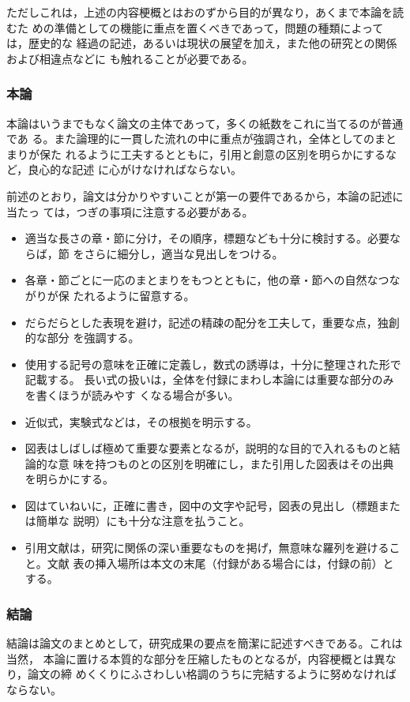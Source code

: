 \documentclass[master]{kuisthesis}		%
\begin{document}
ただしこれは，上述の内容梗概とはおのずから目的が異なり，あくまで本論を読むた
めの準備としての機能に重点を置くべきであって，問題の種類によっては，歴史的な
経過の記述，あるいは現状の展望を加え，また他の研究との関係および相違点などに
も触れることが必要である。

\subsubsection{本論}\label{subsubsec-main}
本論はいうまでもなく論文の主体であって，多くの紙数をこれに当てるのが普通であ
る。また論理的に一貫した流れの中に重点が強調され，全体としてのまとまりが保た
れるように工夫するとともに，引用と創意の区別を明らかにするなど，良心的な記述
に心がけなければならない。

前述のとおり，論文は分かりやすいことが第一の要件であるから，本論の記述に当たっ
ては，つぎの事項に注意する必要がある。
\begin{itemize}%
\item
適当な長さの章・節に分け，その順序，標題なども十分に検討する。必要ならば，節
をさらに細分し，適当な見出しをつける。
\item
各章・節ごとに一応のまとまりをもつとともに，他の章・節への自然なつながりが保
たれるように留意する。
\item
だらだらとした表現を避け，記述の精疎の配分を工夫して，重要な点，独創的な部分
を強調する。
\item
使用する記号の意味を正確に定義し，数式の誘導は，十分に整理された形で記載する。
長い式の扱いは，全体を付録にまわし本論には重要な部分のみを書くほうが読みやす
くなる場合が多い。
\item
近似式，実験式などは，その根拠を明示する。
\item
図表はしばしば極めて重要な要素となるが，説明的な目的で入れるものと結論的な意
味を持つものとの区別を明確にし，また引用した図表はその出典を明らかにする。
\item
図はていねいに，正確に書き，図中の文字や記号，図表の見出し（標題または簡単な
説明）にも十分な注意を払うこと。
\item
引用文献は，研究に関係の深い重要なものを掲げ，無意味な羅列を避けること。文献
表の挿入場所は本文の末尾（付録がある場合には，付録の前）とする。
\end{itemize}%

\subsubsection{結論}\label{subsubsec-conclusion}
結論は論文のまとめとして，研究成果の要点を簡潔に記述すべきである。これは当然，
本論に置ける本質的な部分を圧縮したものとなるが，内容梗概とは異なり，論文の締
めくくりにふさわしい格調のうちに完結するように努めなければならない。
\end{document}
